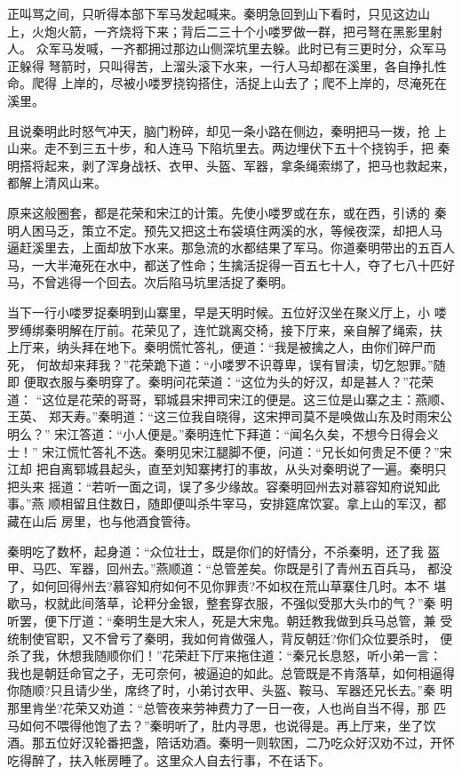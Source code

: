 正叫骂之间，只听得本部下军马发起喊来。秦明急回到山下看时，只见这边山
上，火炮火箭，一齐烧将下来；背后二三十个小喽罗做一群，把弓弩在黑影里射人。
众军马发喊，一齐都拥过那边山侧深坑里去躲。此时已有三更时分，众军马正躲得
弩箭时，只叫得苦，上溜头滚下水来，一行人马却都在溪里，各自挣扎性命。爬得
上岸的，尽被小喽罗挠钩搭住，活捉上山去了；爬不上岸的，尽淹死在溪里。

且说秦明此时怒气冲天，脑门粉碎，却见一条小路在侧边，秦明把马一拨，抢
上山来。走不到三五十步，和人连马下陷坑里去。两边埋伏下五十个挠钩手，把
秦明搭将起来，剥了浑身战袄、衣甲、头盔、军器，拿条绳索绑了，把马也救起来，
都解上清风山来。

原来这般圈套，都是花荣和宋江的计策。先使小喽罗或在东，或在西，引诱的
秦明人困马乏，策立不定。预先又把这土布袋填住两溪的水，等候夜深，却把人马
逼赶溪里去，上面却放下水来。那急流的水都结果了军马。你道秦明带出的五百人
马，一大半淹死在水中，都送了性命；生擒活捉得一百五七十人，夺了七八十匹好
马，不曾逃得一个回去。次后陷马坑里活捉了秦明。

当下一行小喽罗捉秦明到山寨里，早是天明时候。五位好汉坐在聚义厅上，小
喽罗缚绑秦明解在厅前。花荣见了，连忙跳离交椅，接下厅来，亲自解了绳索，扶
上厅来，纳头拜在地下。秦明慌忙答礼，便道：“我是被擒之人，由你们碎尸而死，
何故却来拜我？”花荣跪下道：“小喽罗不识尊卑，误有冒渎，切乞恕罪。”随即
便取衣服与秦明穿了。秦明问花荣道：“这位为头的好汉，却是甚人？”花荣道：
“这位是花荣的哥哥，郓城县宋押司宋江的便是。这三位是山寨之主：燕顺、王英、
郑天寿。”秦明道：“这三位我自晓得，这宋押司莫不是唤做山东及时雨宋公明么？”
宋江答道：“小人便是。”秦明连忙下拜道：“闻名久矣，不想今日得会义士！”
宋江慌忙答礼不迭。秦明见宋江腿脚不便，问道：“兄长如何贵足不便？”宋江却
把自离郓城县起头，直至刘知寨拷打的事故，从头对秦明说了一遍。秦明只把头来
摇道：“若听一面之词，误了多少缘故。容秦明回州去对慕容知府说知此事。”燕
顺相留且住数日，随即便叫杀牛宰马，安排筵席饮宴。拿上山的军汉，都藏在山后
房里，也与他酒食管待。

秦明吃了数杯，起身道：“众位壮士，既是你们的好情分，不杀秦明，还了我
盔甲、马匹、军器，回州去。”燕顺道：“总管差矣。你既是引了青州五百兵马，
都没了，如何回得州去?慕容知府如何不见你罪责?不如权在荒山草寨住几时。本不
堪歇马，权就此间落草，论秤分金银，整套穿衣服，不强似受那大头巾的气？”秦
明听罢，便下厅道：“秦明生是大宋人，死是大宋鬼。朝廷教我做到兵马总管，兼
受统制使官职，又不曾亏了秦明，我如何肯做强人，背反朝廷?你们众位要杀时，
便杀了我，休想我随顺你们！”花荣赶下厅来拖住道：“秦兄长息怒，听小弟一言：
我也是朝廷命官之子，无可奈何，被逼迫的如此。总管既是不肯落草，如何相逼得
你随顺?只且请少坐，席终了时，小弟讨衣甲、头盔、鞍马、军器还兄长去。”秦
明那里肯坐?花荣又劝道：“总管夜来劳神费力了一日一夜，人也尚自当不得，那
匹马如何不喂得他饱了去？”秦明听了，肚内寻思，也说得是。再上厅来，坐了饮
酒。那五位好汉轮番把盏，陪话劝酒。秦明一则软困，二乃吃众好汉劝不过，开怀
吃得醉了，扶入帐房睡了。这里众人自去行事，不在话下。

